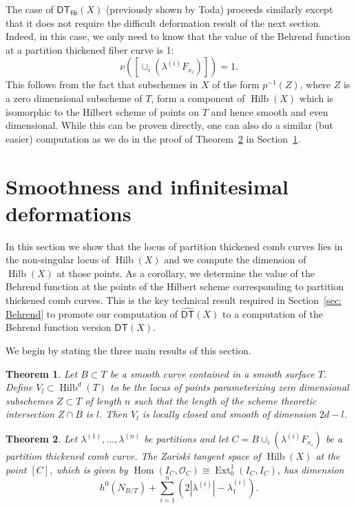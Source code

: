 \documentclass[12pt]{amsart}
\newtheorem{theorem}{Theorem}%
\theoremstyle{definition}
\renewcommand{\O}{\mathcal{O}}
\newcommand{\Hom}{\operatorname{Hom}}
\newcommand{\Ext}{\operatorname{Ext}}
\newcommand{\Hilb}{\operatorname{Hilb}}
\newcommand{\DT}{\mathsf{DT}}
\newcommand{\DThat}{\widehat{\DT}}
\newcommand{\fiber}{\mathsf{fib}}
\newcommand{\presectionspace}{\vspace{0.2cm}} %
\begin{document}
The case of $\DT_{\fiber}(X)$ (previously shown by Toda) proceeds
similarly except that it does not require the difficult deformation
result of the next section. Indeed, in this case, we only need to know
that the value of the Behrend function at a partition thickened fiber
curve is 1:
\[
\nu \left(\left[ \cup_{i} \left(\lambda^{(i)}F_{x_{i}} \right) \right]
\right) =1.
\]
This follows from the fact that subschemes in $X$ of the form
$p^{-1}(Z)$, where $Z$ is a zero dimensional subscheme of $T$, form a
component of $\Hilb (X)$ which is isomorphic to the Hilbert scheme of
points on $T$ and hence smooth and even dimensional. While this can be
proven directly, one can also do a similar (but easier) computation as
we do in the proof of Theorem~\ref{thm: Ext computation} in
Section~\ref{sec: smoothness and deformations}.



\presectionspace
\section{Smoothness and infinitesimal deformations}\label{sec: smoothness and deformations}


In this section we show that the locus of partition thickened comb
curves lies in the non-singular locus of $\Hilb (X)$ and we compute
the dimension of $\Hilb (X)$ at those points. As a corollary, we
determine the value of the Behrend function at the points of the
Hilbert scheme corresponding to partition thickened comb curves. This
is the key technical result required in Section~\ref{sec: Behrend} to
promote our computation of $\DThat (X)$ to a computation of the
Behrend function version $\DT (X)$.


We begin by stating the three main results of this section.

\begin{theorem}\label{thm: strata of Hilb(C^2) with fixed intersection
is smooth} Let $B\subset T$ be a smooth curve contained in a smooth
surface $T$. Define $V_{l}\subset \Hilb^{d}(T)$ to be the locus of
points parameterizing zero dimensional subschemes $Z\subset T$ of length
$n$ such that the length of the scheme theoretic intersection $Z\cap
B$ is $l$. Then $V_{l}$ is locally closed and smooth of dimension
$2d-l$.
\end{theorem}

\begin{theorem}\label{thm: Ext computation}
Let $\lambda^{(1)},\dotsc ,\lambda^{(n)}$ be partitions and let
$C=B\cup_{i}\left(\lambda^{(i)}F_{x_{i}} \right)$ be a partition
thickened comb curve. The Zariski tangent space of $\Hilb (X)$ at
the point $[C]$, which is given by $\Hom (I_{C},\O_{C})\cong
\Ext^{1}_{0}(I_{C},I_{C})$, has dimension
\[
h^{0}(N_{B/T}) + \sum_{i=1}^{n}\left(2|\lambda^{(i)}| - \lambda_{1}^{(i)} \right).
\]
\end{theorem}
\end{document}
